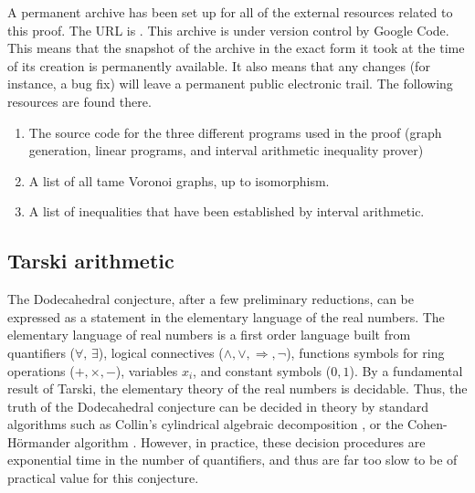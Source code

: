 \documentclass{article} %
\begin{document}
A permanent archive has been set up for all of the external
resources related to this proof.  The URL is \cite{code}.
This archive is under version control by Google Code.  
This means that the snapshot of the archive in the
exact form it took at the time of its creation is permanently available.
It also means that any changes 
(for instance, a  bug fix) will leave
a permanent public electronic trail.
The following resources are found there.
\begin{enumerate}
\item The source code for the three different programs used in the proof (graph generation, linear programs, and interval arithmetic inequality prover)
\item A list of all tame Voronoi graphs, up to isomorphism.
\item A list of inequalities that have been established by interval arithmetic.
\end{enumerate}

\subsection{Tarski arithmetic}


The Dodecahedral conjecture, after a few preliminary reductions, 
can be expressed as a statement
in the elementary language of the real numbers.  The elementary
language of real numbers is a first order language built from
quantifiers ($\forall,\,\exists$), logical connectives ($\land,\lor,\Rightarrow,\neg$), functions symbols for ring operations ($+,\times,-$), variables $x_i$, 
and constant
symbols ($0,1$). By a fundamental
result of Tarski, the elementary theory of the real numbers
is decidable.  Thus, the
truth of the Dodecahedral 
conjecture can be decided in theory by standard
algorithms such as Collin's cylindrical algebraic decomposition \cite{Col}, or the Cohen-H\"ormander algorithm \cite{Hor}.  However,
in practice, these decision procedures are exponential time in the
number of quantifiers, and thus are far too slow to be of practical
value for this conjecture.
\end{document}

